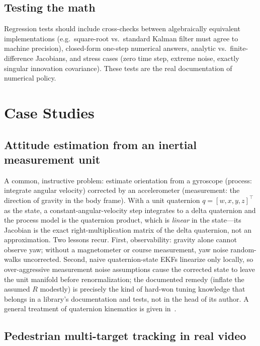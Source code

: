 \documentclass[10pt,conference]{IEEEtran}
\begin{document}
\subsection{Testing the math}

Regression tests should include cross-checks between algebraically equivalent
implementations (e.g.\ square-root vs.\ standard Kalman filter must agree to
machine precision), closed-form one-step numerical answers, analytic vs.\
finite-difference Jacobians, and stress cases (zero time step, extreme noise,
exactly singular innovation covariance). These tests are the real
documentation of numerical policy.

\section{Case Studies}
\label{sec:case-studies}

\subsection{Attitude estimation from an inertial measurement unit}

A common, instructive problem: estimate orientation from a gyroscope
(process: integrate angular velocity) corrected by an accelerometer
(measurement: the direction of gravity in the body frame). With a unit
quaternion $q=[w,x,y,z]^{\top}$ as the state, a constant-angular-velocity
step integrates to a delta quaternion and the process model is the quaternion
product, which is \emph{linear} in the state---its Jacobian is the exact
right-multiplication matrix of the delta quaternion, not an approximation.
Two lessons recur. First, observability: gravity alone cannot observe yaw;
without a magnetometer or course measurement, yaw noise random-walks
uncorrected. Second, naive quaternion-state EKFs linearize only locally, so
over-aggressive measurement noise assumptions cause the corrected state to
leave the unit manifold before renormalization; the documented remedy
(inflate the assumed $R$ modestly) is precisely the kind of hard-won tuning
knowledge that belongs in a library's documentation and tests, not in the head
of its author. A general treatment of quaternion kinematics is given
in~\cite{sola2017quaternion}.

\subsection{Pedestrian multi-target tracking in real video}
\end{document}
